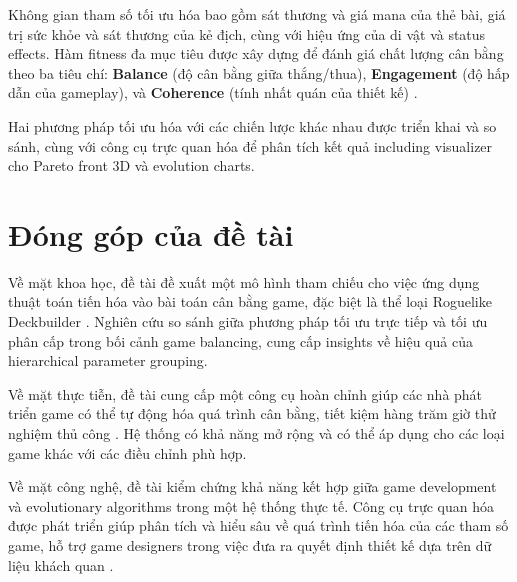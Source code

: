Không gian tham số tối ưu hóa bao gồm sát thương và giá mana của thẻ bài, giá trị sức khỏe và sát thương của kẻ địch, cùng với hiệu ứng của di vật và status effects. Hàm fitness đa mục tiêu được xây dựng để đánh giá chất lượng cân bằng theo ba tiêu chí: \textbf{Balance} (độ cân bằng giữa thắng/thua), \textbf{Engagement} (độ hấp dẫn của gameplay), và \textbf{Coherence} (tính nhất quán của thiết kế) \cite{preuss2012multiobjective}.

Hai phương pháp tối ưu hóa với các chiến lược khác nhau được triển khai và so sánh, cùng với công cụ trực quan hóa để phân tích kết quả including visualizer cho Pareto front 3D và evolution charts.

\section{Đóng góp của đề tài}

Về mặt khoa học, đề tài đề xuất một mô hình tham chiếu cho việc ứng dụng thuật toán tiến hóa vào bài toán cân bằng game, đặc biệt là thể loại Roguelike Deckbuilder \cite{togelius2011search}. Nghiên cứu so sánh giữa phương pháp tối ưu trực tiếp và tối ưu phân cấp trong bối cảnh game balancing, cung cấp insights về hiệu quả của hierarchical parameter grouping.

Về mặt thực tiễn, đề tài cung cấp một công cụ hoàn chỉnh giúp các nhà phát triển game có thể tự động hóa quá trình cân bằng, tiết kiệm hàng trăm giờ thử nghiệm thủ công \cite{jaffe2012optimizing, nelson2016towards}. Hệ thống có khả năng mở rộng và có thể áp dụng cho các loại game khác với các điều chỉnh phù hợp.

Về mặt công nghệ, đề tài kiểm chứng khả năng kết hợp giữa game development và evolutionary algorithms trong một hệ thống thực tế. Công cụ trực quan hóa được phát triển giúp phân tích và hiểu sâu về quá trình tiến hóa của các tham số game, hỗ trợ game designers trong việc đưa ra quyết định thiết kế dựa trên dữ liệu khách quan \cite{smith2011analyzing}.


